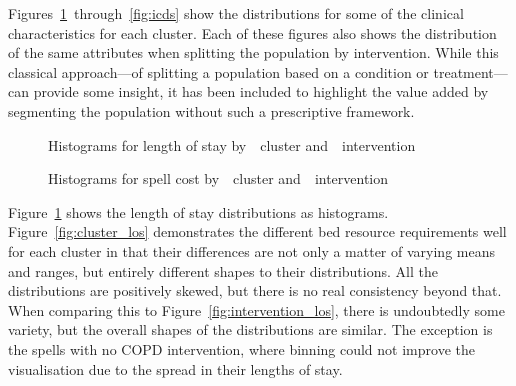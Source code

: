 \documentclass[]{interact}
\newlength{\imgwidth}
\theoremstyle{plain}%
\theoremstyle{definition}
\theoremstyle{remark}
\begin{document}
Figures~\ref{fig:los}~through~\ref{fig:icds} show the distributions for some
of the clinical characteristics for each cluster. Each of these figures also
shows the distribution of the same attributes when splitting the population by
intervention. While this classical approach---of splitting a population based on
a condition or treatment---can provide some insight, it has been included to
highlight the value added by segmenting the population without such a
prescriptive framework.

\begin{figure}
    \centering

    \caption{%
        Histograms for length of stay by~~cluster
        and~~intervention
    }
    \label{fig:los}
\end{figure}

\begin{figure}
    \centering

    \caption{%
        Histograms for spell cost by~~cluster
        and~~intervention
    }
    \label{fig:cost}
\end{figure}

Figure~\ref{fig:los} shows the length of stay distributions as histograms.
Figure~\ref{fig:cluster_los} demonstrates the different bed resource
requirements well for each cluster in that their differences are not only a
matter of varying means and ranges, but entirely different shapes to their
distributions. All the distributions are positively skewed, but there is no real
consistency beyond that. When comparing this to
Figure~\ref{fig:intervention_los}, there is undoubtedly some variety, but the
overall shapes of the distributions are similar. The exception is the spells
with no COPD intervention, where binning could not improve the visualisation due
to the spread in their lengths of stay.
\end{document}
